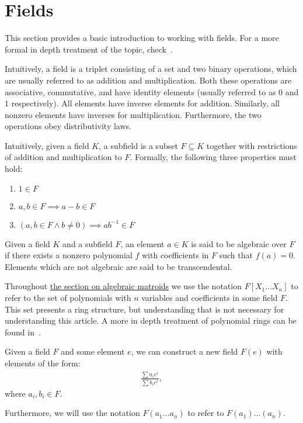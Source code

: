 \section{Fields}\label{sec:appendix-fields}

This section provides a basic introduction to working with fields. For a more formal in depth treatment of the topic, check~\cite{milne2022}.

\begin{defn}[Fields]
  Intuitively, a field is a triplet consisting of a set and two binary operations, which are usually referred to as addition and multiplication. Both these operations are associative, commutative, and have identity elements (usually referred to as $0$ and $1$ respectively). All elements have inverse elements for addition. Similarly, all nonzero elements have inverses for multiplication. Furthermore, the two operations obey distributivity laws.
\end{defn}

\begin{defn}[Subfields]
  Intuitively, given a field $K$, a subfield is a subset $F \subseteq K$ together with restrictions of addition and multiplication to $F$. Formally, the following three properties must hold:
  \begin{enumerate}
    \item $1 \in F$
    \item $a, b \in F \implies a - b \in F$
    \item $(a, b \in F \land b \neq 0) \implies a b ^{-1}  \in F$
  \end{enumerate}
\end{defn}

\begin{defn}
  Given a field $K$ and a subfield $F$, an element $a \in K$ is said to be algebraic over $F$ if there exists a nonzero polynomial $f$ with coefficients in $F$ such that $f(a) = 0$. Elements which are not algebraic are said to be transcendental.
\end{defn}


Throughout \hyperref[sec:algebraic-matroids]{the section on algebraic matroids} we use the notation $F[X _1 \ldots X_n]$ to refer to the set of polynomials with $n$ variables and coefficients in some field $F$. This set presents a ring structure, but understanding that is not necessary for understanding this article. A more in depth treatment of polynomial rings can be found in~\cite{milne2022}.


\begin{defn} \label{def:field-adjoint}
  Given a field $F$ and some element $e$, we can construct a new field $F(e)$ with elements of the form:
\begin{align*}
  \frac{\sum a _i e ^i }{\sum b _i e ^i },
\end{align*}
where $a _i, b _i \in F$.

  Furthermore, we will use the notation $F(a _1 \ldots a _n)$ to refer to $F(a _1) \ldots (a _n)$.
\end{defn}

